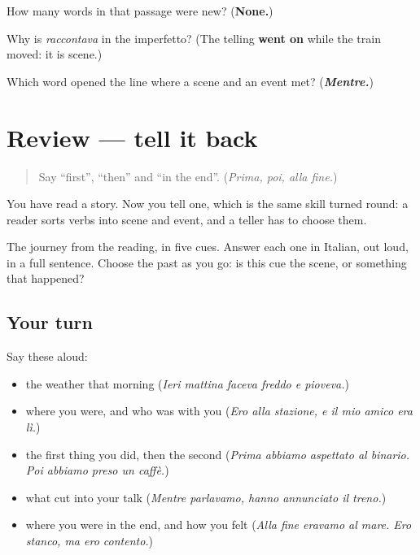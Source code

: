 \begin{tcolorbox}[breakable,colback=teal!4,colframe=teal!35!black,title={Before you move on}]
How many words in that passage were new? (\textbf{None.})

Why is \emph{raccontava} in the imperfetto? (The telling \textbf{went on} while the train moved: it is scene.)

Which word opened the line where a scene and an event met? (\emph{\textbf{Mentre.}})
\end{tcolorbox}
\section[(review)]{Review — tell it back}

\label{lesson:IT-C264-ripasso-racconto}



\begin{quote}
Say \textquotedblleft{}first\textquotedblright{}, \textquotedblleft{}then\textquotedblright{} and \textquotedblleft{}in the end\textquotedblright{}. (\emph{Prima, poi, alla fine.})
\end{quote}

\begin{grammarlens}[title={What you've built}]
You have read a story. Now you tell one, which is the same skill turned round: a reader sorts verbs into scene and event, and a teller has to choose them.

The journey from the reading, in five cues. Answer each one in Italian, out loud, in a full sentence. Choose the past as you go: is this cue the scene, or something that happened?
\end{grammarlens}

\subsection*{Your turn}
Say these aloud:

\begin{itemize}
\raggedright
  \item the weather that morning (\emph{Ieri mattina faceva freddo e pioveva.})
  \item where you were, and who was with you (\emph{Ero alla stazione, e il mio amico era lì.})
  \item the first thing you did, then the second (\emph{Prima abbiamo aspettato al binario. Poi abbiamo preso un caffè.})
  \item what cut into your talk (\emph{Mentre parlavamo, hanno annunciato il treno.})
  \item where you were in the end, and how you felt (\emph{Alla fine eravamo al mare. Ero stanco, ma ero contento.})
\end{itemize}

